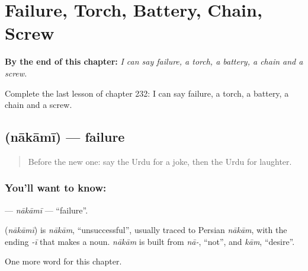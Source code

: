 
\chapter{Failure, Torch, Battery, Chain, Screw}
\label{ch:ur-failure-torch-battery-chain-screw}

\begin{chapteropening}
\textbf{By the end of this chapter:} \emph{I can say failure, a torch, a battery, a chain and a screw.}

Complete the last lesson of chapter 232: I can say failure, a torch, a battery, a chain and a screw.
\end{chapteropening}

\section[\texorpdfstring{\ur{ناکامی} (nākāmī)}{ناکامی (nākāmī)}]{ (nākāmī) — failure}

\label{lesson:UR-C232-nakami}



\begin{quote}
Before the new one: say the Urdu for a joke, then the Urdu for laughter.
\end{quote}

\subsection*{You'll want to know: }
\textbf{} — \emph{nākāmī} — \textquotedblleft{}failure\textquotedblright{}.

\begin{cousinweb}
\textbf{} (\emph{nākāmī}) is \emph{nākām}, \textquotedblleft{}unsuccessful\textquotedblright{}, usually traced to Persian \emph{nākām}, with the ending \emph{-ī} that makes a noun. \emph{nākām} is built from \emph{nā-}, \textquotedblleft{}not\textquotedblright{}, and \emph{kām}, \textquotedblleft{}desire\textquotedblright{}.
\end{cousinweb}

\begin{grammarlens}[title={What you've built}]
One more word for this chapter.
\end{grammarlens}

